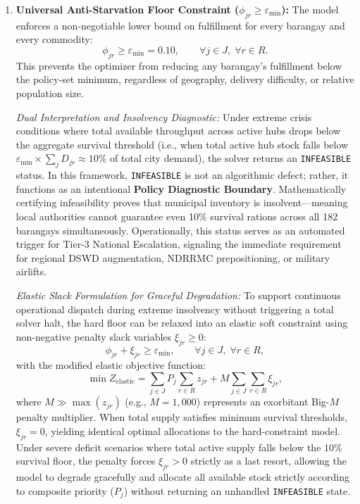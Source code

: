 \begin{enumerate}
    \item \textbf{Universal Anti-Starvation Floor Constraint ($\phi_{jr} \ge \varepsilon_{\min}$):} 
    The model enforces a non-negotiable lower bound on fulfillment for every barangay and every commodity:
    \begin{equation}
        \phi_{jr} \ge \varepsilon_{\min} = 0.10, \qquad \forall j \in J, \; \forall r \in R.
    \end{equation}
    This prevents the optimizer from reducing any barangay's fulfillment below the policy-set minimum, regardless of geography, delivery difficulty, or relative population size.

    \textit{Dual Interpretation and Insolvency Diagnostic:} Under extreme crisis conditions where total available throughput across active hubs drops below the aggregate survival threshold (i.e., when total active hub stock falls below $\varepsilon_{\min} \times \sum_{j} D_{jr} \approx 10\%$ of total city demand), the solver returns an \texttt{INFEASIBLE} status. In this framework, \texttt{INFEASIBLE} is not an algorithmic defect; rather, it functions as an intentional \textbf{Policy Diagnostic Boundary}. Mathematically certifying infeasibility proves that municipal inventory is insolvent---meaning local authorities cannot guarantee even 10\% survival rations across all 182 barangays simultaneously. Operationally, this status serves as an automated trigger for Tier-3 National Escalation, signaling the immediate requirement for regional DSWD augmentation, NDRRMC prepositioning, or military airlifts.

    \textit{Elastic Slack Formulation for Graceful Degradation:} To support continuous operational dispatch during extreme insolvency without triggering a total solver halt, the hard floor can be relaxed into an elastic soft constraint using non-negative penalty slack variables $\xi_{jr} \ge 0$:
    \begin{equation}
        \phi_{jr} + \xi_{jr} \ge \varepsilon_{\min}, \qquad \forall j \in J, \; \forall r \in R,
    \end{equation}
    with the modified elastic objective function:
    \begin{equation}
        \min Z_{\text{elastic}} = \sum_{j \in J} P_j \sum_{r \in R} z_{jr} + M \sum_{j \in J} \sum_{r \in R} \xi_{jr},
    \end{equation}
    where $M \gg \max(z_{jr})$ (e.g., $M = 1{,}000$) represents an exorbitant Big-$M$ penalty multiplier. When total supply satisfies minimum survival thresholds, $\xi_{jr} = 0$, yielding identical optimal allocations to the hard-constraint model. Under severe deficit scenarios where total active supply falls below the $10\%$ survival floor, the penalty forces $\xi_{jr} > 0$ strictly as a last resort, allowing the model to degrade gracefully and allocate all available stock strictly according to composite priority ($P_j$) without returning an unhandled \texttt{INFEASIBLE} state.


\end{enumerate}
